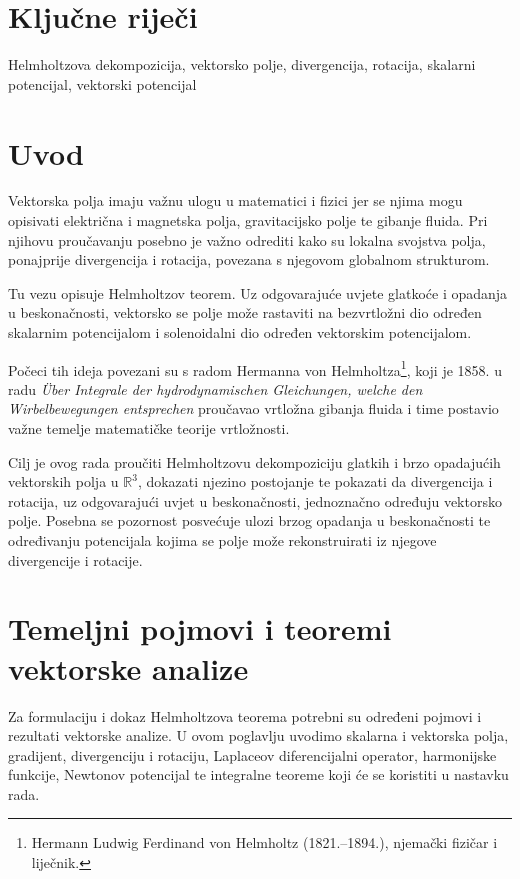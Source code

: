 \documentclass[12pt,a4paper]{article}
\begin{document}
\section*{Ključne riječi}

Helmholtzova dekompozicija, vektorsko polje, divergencija, rotacija,
skalarni potencijal, vektorski potencijal

\newpage
\hypersetup{pageanchor=true}
\setcounter{page}{1}

\section{Uvod}

Vektorska polja imaju važnu ulogu u matematici i fizici jer se njima mogu
opisivati električna i magnetska polja, gravitacijsko polje te gibanje
fluida. Pri njihovu proučavanju posebno je važno odrediti kako su lokalna
svojstva polja, ponajprije divergencija i rotacija, povezana s njegovom
globalnom strukturom.

Tu vezu opisuje Helmholtzov teorem. Uz odgovarajuće uvjete
glatkoće i opadanja u beskonačnosti, vektorsko se polje može rastaviti na
bezvrtložni dio određen skalarnim potencijalom i solenoidalni dio određen
vektorskim potencijalom. 

Počeci tih ideja povezani su s radom Hermanna von Helmholtza\footnote{Hermann Ludwig
Ferdinand von Helmholtz (1821.--1894.),
njemački fizičar i liječnik.}, koji je 1858. u radu
\textit{Über Integrale der hydrodynamischen Gleichungen, welche den
Wirbelbewegungen entsprechen} proučavao vrtložna gibanja
fluida i time postavio važne temelje matematičke teorije vrtložnosti.

Cilj je ovog rada proučiti Helmholtzovu dekompoziciju glatkih i brzo opadajućih vektorskih polja u $\mathbb{R}^3$, dokazati njezino postojanje te pokazati da divergencija i rotacija, uz odgovarajući uvjet u beskonačnosti, jednoznačno određuju vektorsko polje.
Posebna se pozornost posvećuje ulozi brzog opadanja u beskonačnosti te
određivanju potencijala kojima se polje može rekonstruirati iz njegove
divergencije i rotacije.\newpage
\section{Temeljni pojmovi i teoremi vektorske analize}

Za formulaciju i dokaz Helmholtzova teorema potrebni su određeni pojmovi i rezultati vektorske analize. U ovom poglavlju uvodimo skalarna i vektorska polja, gradijent, divergenciju i rotaciju, Laplaceov diferencijalni operator, harmonijske funkcije, Newtonov potencijal te integralne teoreme koji će se koristiti u nastavku rada.
\end{document}
